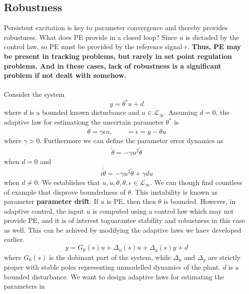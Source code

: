 \documentclass[10pt]{article}
\begin{document}
\begin{multicols*}{2}
\section{Robustness}
Persistent excitation is key to parameter convergence and thereby provides robustness. What does PE provide in a closed loop? Since $u$ is dictaded by the control law, so PE must be provided by the reference signal $r$. \textbf{Thus, PE may be present in tracking problems, but rarely in set point regulation problems. And in these cases, lack of robustness is a significant problem if not dealt with somehow.}
\\\\
Consider the system
\begin{equation*}
	y = \theta^{*}u + d
\end{equation*}
where $d$ is a bounded known disturbance and $u \in \mathcal{L}_{\infty}$.
Assuming $d=0$, the adaptive law for estimationg the uncertain  parameter $\theta^{*}$ is
\begin{equation*}
	\dot \theta = \gamma \epsilon u, \qquad = \epsilon = y - \theta u
\end{equation*}
where $\gamma > 0$. Furthermore we can define the parameter error dynamics as
\begin{equation*}
	\dot{\tilde{\theta}} = - \gamma u^{2}\tilde{\theta}
\end{equation*}
when $d = 0$ and
\begin{equation*}
	i \dot{\tilde{\theta}} = - \gamma u^{2}\tilde{\theta} + \gamma d u
\end{equation*}
when $d \neq 0$. We establishes that $u, \dot{u}, \dot{\theta}, \theta, \epsilon  \in \mathcal{L}_\infty $. We can though find countless of example that disprove boundedness of $\theta$. This instability is known as parameter \textbf{parameter drift}. If $u$ is PE, then then $\theta$ is bounded. However, in adaptive control, the input $u$ is computed using a control law which may not provide PE, and it is of interest toguarantee stability and robustness in this case as well. This can be achived by modifying the adaptive laws we haev developed earlier.
\begin{equation}
	y=G_0(s) u+\Delta_u(s) u+\Delta_y(s) y+d
\end{equation}
where $G_0(s)$ is the dobinant part of the system, while $\Delta_u \text{ and } \Delta _y$ are strictly proper with stable poles representing unmodelled dynamics of the plant. $d$ is a bounded disturbance. We want to design adaptive laws for estimating the parameters in

\end{multicols*}
\end{document}
